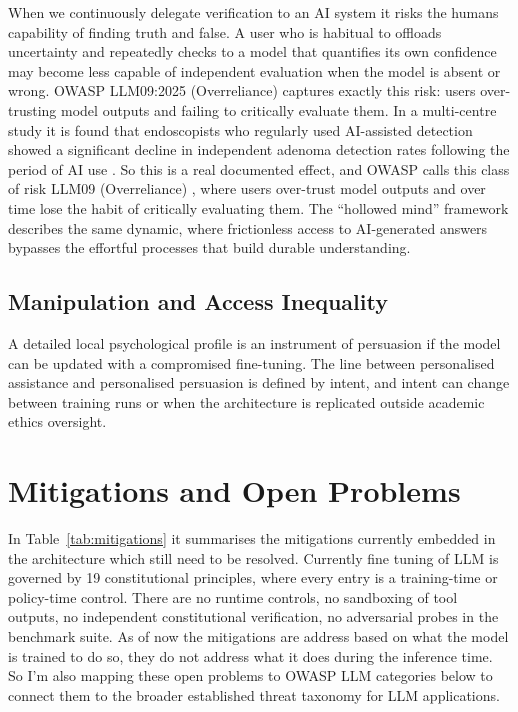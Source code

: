 \documentclass[11pt,a4paper]{article}
\begin{document}
When we continuously delegate verification to an AI system it risks the humans capability of finding truth and false. A user who is habitual to offloads uncertainty and repeatedly checks to a model that quantifies its own confidence may become less capable of independent evaluation when the model is absent or wrong. OWASP LLM09:2025 (Overreliance) \cite{owasp2025} captures exactly this risk: users over-trusting model outputs and failing to critically evaluate them. In a multi-centre study it is found that endoscopists who regularly used AI-assisted detection showed a significant decline in independent adenoma detection rates following the period of AI use \cite{endoscopist_deskilling}. So this is a real documented effect, and OWASP calls this class of risk LLM09 (Overreliance) \cite{owasp2025}, where users over-trust model outputs and over time lose the habit of critically evaluating them. The ``hollowed mind'' framework \cite{hollowed_mind} describes the same dynamic, where frictionless access to AI-generated answers bypasses the effortful processes that build durable understanding.

\subsection{Manipulation and Access Inequality}

A detailed local psychological profile is an instrument of persuasion if the model can be updated with a compromised fine-tuning. The line between personalised assistance and personalised persuasion is defined by intent, and intent can change between training runs or when the architecture is replicated outside academic ethics oversight.

\section{Mitigations and Open Problems}
\label{sec:mitigations}

In Table~\ref{tab:mitigations} it summarises the mitigations currently embedded in the architecture which still need to be resolved. Currently fine tuning of LLM is governed by 19 constitutional principles, where every entry is a training-time or policy-time control. There are no runtime controls, no sandboxing of tool outputs, no independent constitutional verification, no adversarial probes in the benchmark suite. As of now the mitigations are address based on what the model is trained to do so, they do not address what it does during the inference time. So I'm also mapping these open problems to OWASP LLM categories \cite{owasp2025} below to connect them to the broader established threat taxonomy for LLM applications.
\end{document}
